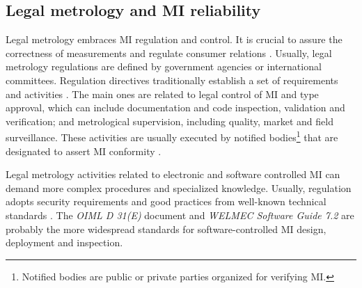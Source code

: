 \documentclass[journal]{IEEEtran}
\begin{document}
\subsection{Legal metrology and MI reliability}
\label{s:mi_realiability}
Legal metrology embraces MI regulation and control. It is crucial to assure the correctness of measurements \cite{RodriguesFilho2015} and regulate consumer relations \cite{Oppermann2018}.
Usually, legal metrology regulations are defined by government agencies or international committees. 
Regulation directives traditionally establish a set of requirements and activities \cite{RodriguesFilho2015}.
The main ones are related to legal control of MI and type approval, which can include documentation and code inspection, validation and verification; and metrological supervision, including quality, market and field surveillance.
These activities are usually executed by notified bodies\footnote{Notified bodies are public or private parties organized for verifying MI.} that are designated to assert MI conformity \cite{Esche2015,Oppermann2018}. 

Legal metrology activities related to electronic and software controlled MI can demand more complex procedures and specialized knowledge.
Usually, regulation adopts security requirements and good practices from well-known technical standards \cite{Esche2015,Peters2015,Luchsinger2008}. 
The \emph{OIML D 31(E)} document \cite{InternationalOrganizationofLegalMetrologyOIML2008} and \emph{WELMEC Software Guide 7.2} \cite{EuropeanCooperationinLegalMetrologyWELMEC2015} are probably the more widespread standards for software-controlled MI design, deployment and inspection.
\end{document}
